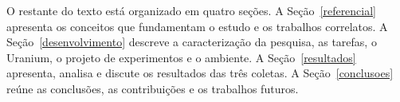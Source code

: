 O restante do texto está organizado em quatro seções. A Seção~\ref{referencial} apresenta os conceitos que fundamentam o estudo e os trabalhos correlatos. A Seção~\ref{desenvolvimento} descreve a caracterização da pesquisa, as tarefas, o Uranium, o projeto de experimentos e o ambiente. A Seção~\ref{resultados} apresenta, analisa e discute os resultados das três coletas. A Seção~\ref{conclusoes} reúne as conclusões, as contribuições e os trabalhos futuros.
